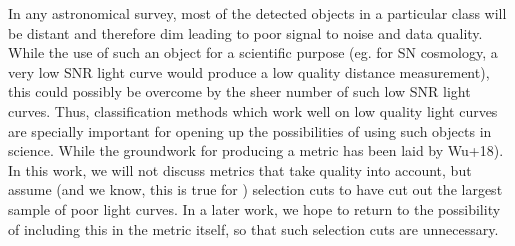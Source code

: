 In any astronomical survey, most of the detected objects in a particular class will be distant and therefore dim leading to poor signal to noise and data quality. While the use of such an object for a scientific purpose (eg. for SN cosmology, a very low SNR light curve would produce a low quality distance measurement), this could possibly be overcome by the sheer number of such low SNR light curves. Thus, classification methods which
work well on low quality light curves are specially important for opening up the possibilities of using such objects in science. While the groundwork for producing a metric has been laid by Wu+18). In this work, we will not discuss metrics that take quality into account, but assume (and we know, this is true for \plasticc )
 selection cuts to have cut out the largest  sample of poor light curves. In a later work, we hope to return to the possibility of including this in the metric itself, so that such selection cuts are unnecessary.

